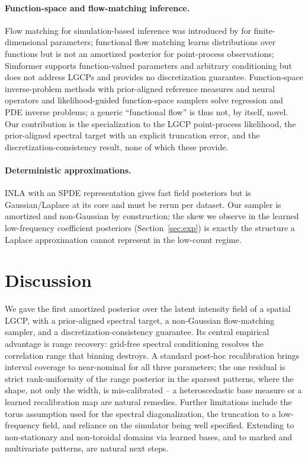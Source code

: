 \documentclass[10pt,twocolumn]{article}
\begin{document}
\paragraph{Function-space and flow-matching inference.}
Flow matching for simulation-based inference was introduced by
\citet{dax2023flow} for finite-dimensional parameters; functional flow matching
\citep{kerrigan2024functional} learns distributions over functions but is not an
amortized posterior for point-process observations; Simformer
\citep{gloeckler2024all} supports function-valued parameters and arbitrary
conditioning but does not address LGCPs and provides no discretization guarantee.
Function-space inverse-problem methods with prior-aligned reference measures and
neural operators \citep{cheng2026function} and likelihood-guided function-space
samplers \citep{shi2026function} solve regression and PDE inverse problems; a
generic ``functional flow'' is thus not, by itself, novel. Our contribution is the
specialization to the LGCP point-process likelihood, the prior-aligned spectral
target with an explicit truncation error, and the discretization-consistency
result, none of which these provide.

\paragraph{Deterministic approximations.}
INLA with an SPDE representation \citep{rue2009approximate,lindgren2011explicit}
gives fast field posteriors but is Gaussian/Laplace at its core and must be rerun
per dataset. Our sampler is amortized and non-Gaussian by construction; the
skew we observe in the learned low-frequency coefficient posteriors
(Section~\ref{sec:exp}) is exactly the structure a Laplace approximation cannot
represent in the low-count regime.

\section{Discussion}

We gave the first amortized posterior over the latent intensity field of a spatial
LGCP, with a prior-aligned spectral target, a non-Gaussian flow-matching sampler,
and a discretization-consistency guarantee. Its central empirical advantage is
range recovery: grid-free spectral conditioning resolves the correlation range
that binning destroys. A standard post-hoc recalibration brings interval coverage
to near-nominal for all three parameters; the one residual is strict
rank-uniformity of the range posterior in the sparsest patterns, where the shape,
not only the width, is mis-calibrated -- a heteroscedastic base measure or a
learned recalibration map are natural remedies.
Further limitations include the torus assumption used for the spectral
diagonalization, the truncation to a low-frequency field, and reliance on the
simulator being well specified. Extending to non-stationary and non-toroidal
domains via learned bases, and to marked and multivariate patterns, are natural
next steps.

{\small

}
\end{document}
